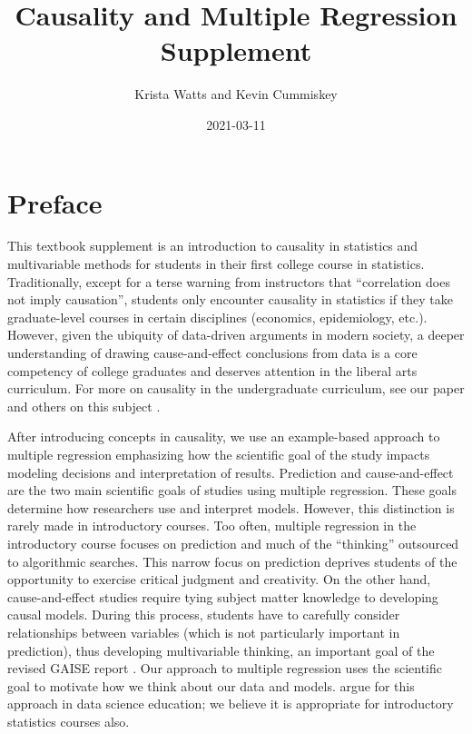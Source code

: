 \documentclass[
]{book}
\title{Causality and Multiple Regression Supplement}
\author{Krista Watts and Kevin Cummiskey}
\date{2021-03-11}
\begin{document}
\maketitle

{
\setcounter{tocdepth}{1}
\tableofcontents
}
\hypertarget{preface}{%
\chapter*{Preface}\label{preface}}

This textbook supplement is an introduction to causality in statistics and multivariable methods for students in their first college course in statistics. Traditionally, except for a terse warning from instructors that ``correlation does not imply causation'', students only encounter causality in statistics if they take graduate-level courses in certain disciplines (economics, epidemiology, etc.). However, given the ubiquity of data-driven arguments in modern society, a deeper understanding of drawing cause-and-effect conclusions from data is a core competency of college graduates and deserves attention in the liberal arts curriculum. For more on causality in the undergraduate curriculum, see our paper \citep{cummiskey2020causal} and others on this subject \citep{horton2015challenges, kaplan2018teaching, lubke2020we}.

After introducing concepts in causality, we use an example-based approach to multiple regression emphasizing how the scientific goal of the study impacts modeling decisions and interpretation of results. Prediction and cause-and-effect are the two main scientific goals of studies using multiple regression. These goals determine how researchers use and interpret models. However, this distinction is rarely made in introductory courses. Too often, multiple regression in the introductory course focuses on prediction and much of the ``thinking'' outsourced to algorithmic searches. This narrow focus on prediction deprives students of the opportunity to exercise critical judgment and creativity. On the other hand, cause-and-effect studies require tying subject matter knowledge to developing causal models. During this process, students have to carefully consider relationships between variables (which is not particularly important in prediction), thus developing multivariable thinking, an important goal of the revised GAISE report \citep{carver2016guidelines}. Our approach to multiple regression uses the scientific goal to motivate how we think about our data and models. \citet{hernan2019second} argue for this approach in data science education; we believe it is appropriate for introductory statistics courses also.
\end{document}
